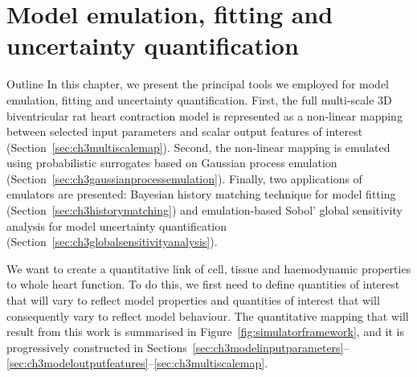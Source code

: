 \chapter{Model emulation, fitting and uncertainty 
quantification}\label{cha:chapter3}
%
%
%
\begin{remark}{Outline}
    In this chapter, we present the principal tools we employed for model emulation, fitting and uncertainty quantification. First, the full multi-scale $3$D biventricular rat heart contraction model is represented as a non-linear mapping between selected input parameters and scalar output features of interest (Section~\ref{sec:ch3multiscalemap}). Second, the non-linear mapping is emulated using probabilistic surrogates based on Gaussian process emulation (Section~\ref{sec:ch3gaussianprocessemulation}). Finally, two applications of emulators are presented: Bayesian history matching technique for model fitting (Section~\ref{sec:ch3historymatching}) and emulation-based Sobol' global sensitivity analysis for model uncertainty quantification (Section~\ref{sec:ch3globalsensitivityanalysis}).
\end{remark}

We want to create a quantitative link of cell, tissue and haemodynamic properties to whole heart function. To do this, we first need to define quantities of interest that will vary to reflect model properties and quantities of interest that will consequently vary to reflect model behaviour. The quantitative mapping that will result from this work is summarised in Figure~\ref{fig:simulatorframework}, and it is progressively constructed in Sections~\ref{sec:ch3modelinputparameters}--\ref{sec:ch3modeloutputfeatures}--\ref{sec:ch3multiscalemap}.

